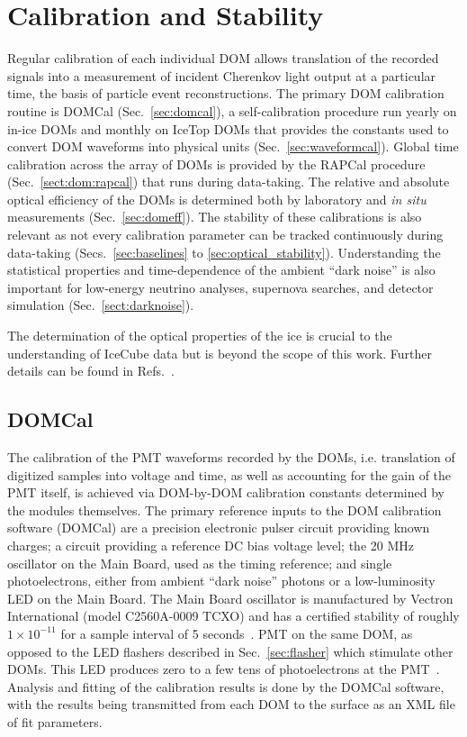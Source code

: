 \section{\label{sec:dom_calibration}Calibration and Stability}

Regular calibration of each individual DOM allows translation of the
recorded signals into a measurement of incident Cherenkov light output at a
particular time, the basis of particle event reconstructions.  The
primary DOM calibration routine is DOMCal (Sec.~\ref{sec:domcal}), a
self-calibration procedure run yearly on in-ice DOMs and monthly on IceTop
DOMs that provides the constants used to convert DOM waveforms into
physical units (Sec.~\ref{sec:waveformcal}).  Global time calibration across the array of DOMs is 
provided by the RAPCal procedure (Sec.~\ref{sect:dom:rapcal}) that runs during
data-taking.  The relative and absolute optical efficiency of the DOMs is
determined both by laboratory and \emph{in situ} measurements
(Sec.~\ref{sec:domeff}). The stability of these calibrations is also relevant
as not every calibration parameter can be tracked continuously during
data-taking (Secs.~\ref{sec:baselines} to \ref{sec:optical_stability}).
Understanding the statistical properties and time-dependence of the ambient ``dark
noise'' is also important for low-energy neutrino analyses, supernova
searches, and detector simulation (Sec.~\ref{sect:darknoise}).

The determination of the optical properties of the ice is crucial to
the understanding of IceCube data but is beyond the scope of this work.
Further details can be found in Refs.~\cite{Aartsen:2013rt,IC3:spice_lea}.

\subsection{\label{sec:domcal}DOMCal}

The calibration of the PMT waveforms recorded by the DOMs, i.e. translation
of digitized samples into voltage and time, as well as accounting for the
gain of the PMT itself, is achieved via DOM-by-DOM calibration constants
determined by the modules themselves. The primary reference inputs to
the DOM calibration software (DOMCal) are a precision electronic
pulser circuit providing known charges; a circuit providing a reference DC
bias voltage level; the 20 MHz oscillator on the Main
Board, used as the timing reference; and single photoelectrons, either from
ambient ``dark noise'' photons or a low-luminosity LED on the Main
Board. The Main Board oscillator is manufactured by Vectron
International (model C2560A-0009 TCXO) and has a certified stability
of roughly $1 \times 10^{-11}$ for a sample interval of 5 seconds~\cite{ICECUBE:DAQ}.
PMT on the same DOM, as opposed to the LED flashers described in
Sec.~\ref{sec:flasher} which stimulate other DOMs. This LED produces
zero to a few tens of photoelectrons at the PMT~\cite{ICECUBE:DAQ}. Analysis and fitting of the
calibration results is done by the DOMCal software, with the results being
transmitted from each DOM to the surface as an XML file of fit parameters.

